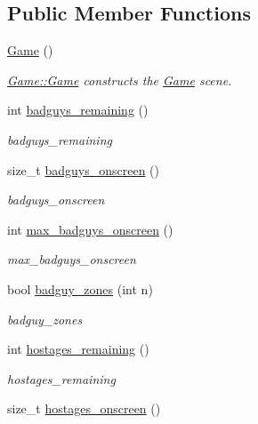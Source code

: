 \subsection*{Public Member Functions}
\begin{DoxyCompactItemize}
\item 
\hypertarget{class_game_ad59df6562a58a614fda24622d3715b65}{}\hyperlink{class_game_ad59df6562a58a614fda24622d3715b65}{Game} ()\label{class_game_ad59df6562a58a614fda24622d3715b65}

\begin{DoxyCompactList}\small\item\em \hyperlink{class_game_ad59df6562a58a614fda24622d3715b65}{Game\+::\+Game} constructs the \hyperlink{class_game}{Game} scene. \end{DoxyCompactList}\item 
int \hyperlink{class_game_a1723c85835165e0a3353b58350401cd9}{badguys\+\_\+remaining} ()
\begin{DoxyCompactList}\small\item\em badguys\+\_\+remaining \end{DoxyCompactList}\item 
size\+\_\+t \hyperlink{class_game_a6771d472a6adaf1bcc58f997b96f2c16}{badguys\+\_\+onscreen} ()
\begin{DoxyCompactList}\small\item\em badguys\+\_\+onscreen \end{DoxyCompactList}\item 
int \hyperlink{class_game_a6314e99dd420bef0775f61c3d1c30bc7}{max\+\_\+badguys\+\_\+onscreen} ()
\begin{DoxyCompactList}\small\item\em max\+\_\+badguys\+\_\+onscreen \end{DoxyCompactList}\item 
bool \hyperlink{class_game_a978ecd228e6274e192e545b8a49eff9b}{badguy\+\_\+zones} (int n)
\begin{DoxyCompactList}\small\item\em badguy\+\_\+zones \end{DoxyCompactList}\item 
int \hyperlink{class_game_a132981c00605a3a030510aac18e16636}{hostages\+\_\+remaining} ()
\begin{DoxyCompactList}\small\item\em hostages\+\_\+remaining \end{DoxyCompactList}\item 
size\+\_\+t \hyperlink{class_game_a8eb0a78447492976f2af4d69e5f4430e}{hostages\+\_\+onscreen} ()

\end{DoxyCompactItemize}
